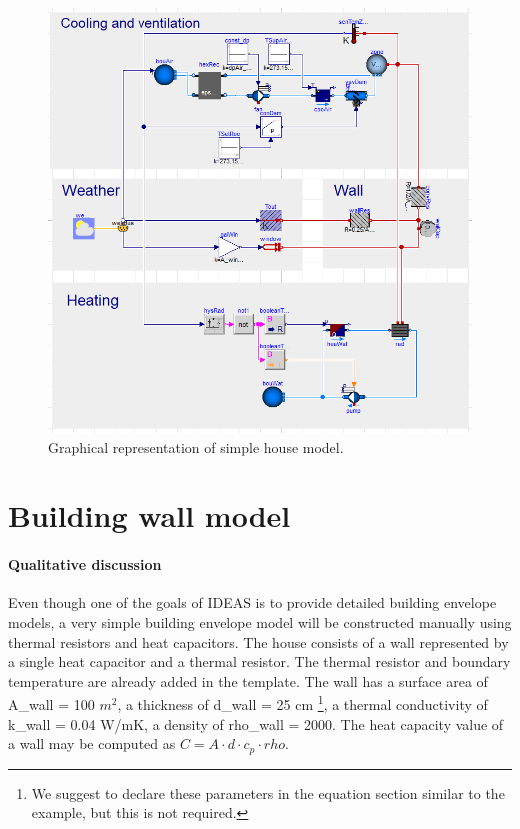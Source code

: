 \documentclass[10pt,a4paper]{article}
\begin{document}
\begin{figure}[h!]
\centering
\includegraphics[scale=0.35]{simpleHouse.png}
\caption{Graphical representation of simple house model.}
\label{fig:simpleHouse}
\end{figure}


\section{Building wall model}
\paragraph{Qualitative discussion}
Even though one of the goals of IDEAS is to provide
detailed building envelope models, a very simple building
envelope model will be constructed manually using thermal
resistors and heat capacitors.
The house consists of a wall represented 
by a single heat capacitor and a thermal resistor. 
The thermal resistor and boundary temperature 
are already added in the template.
The wall has a surface area of A\_wall = 100 $m^2$, 
a thickness of d\_wall = 25 cm
\footnote{We suggest to declare these parameters in the equation section similar to the example, but this is not required.}, 
a thermal conductivity of k\_wall = 0.04 W/mK, 
a density of rho\_wall = 2000.
The heat capacity value of a wall may be computed as $C=A\cdot d \cdot c_p \cdot rho$.
\end{document}
